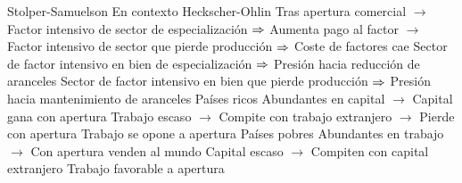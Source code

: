 \documentclass{nuevotema}
\begin{document}
\begin{esquemal}
			\3 Stolper-Samuelson
				\4 En contexto Heckscher-Ohlin
				\4 Tras apertura comercial
				\4[] $\to$ Factor intensivo de sector de especialización
				\4[] $\then$ Aumenta pago al factor
				\4[] $\to$ Factor intensivo de sector que pierde producción
				\4[] $\then$ Coste de factores cae
				\4 Sector de factor intensivo en bien de especialización
				\4[] $\then$ Presión hacia reducción de aranceles
				\4 Sector de factor intensivo en bien que pierde producción
				\4[] $\then$ Presión hacia mantenimiento de aranceles
				\4 Países ricos
				\4[] Abundantes en capital
				\4[] $\to$ Capital gana con apertura
				\4[] Trabajo escaso
				\4[] $\to$ Compite con trabajo extranjero
				\4[] $\to$ Pierde con apertura
				\4[$\then$] Trabajo se opone a apertura
				\4 Países pobres
				\4[] Abundantes en trabajo
				\4[] $\to$ Con apertura venden al mundo
				\4[] Capital escaso
				\4[] $\to$ Compiten con capital extranjero
				\4[$\then$] Trabajo favorable a apertura


\end{esquemal}
\end{document}
